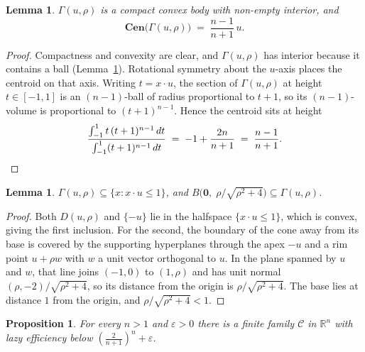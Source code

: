 \documentclass[12pt]{article}
\newtheorem{lemma}[theorem]{Lemma}
\newtheorem{proposition}[theorem]{Proposition}
\theoremstyle{definition}
\newcommand{\R}{\mathbb{R}}
\newcommand{\Cen}{\mathbf{Cen}}
\begin{document}
\begin{lemma}\label{lem:conebody}
$\Gamma(u,\rho)$ is a compact convex body with non-empty interior, and
\[
  \Cen\bigl(\Gamma(u,\rho)\bigr)\;=\;\frac{n-1}{n+1}\,u .
\]
\end{lemma}

\begin{proof}
Compactness and convexity are clear, and $\Gamma(u,\rho)$ has interior because
it contains a ball (Lemma~\ref{lem:conebounds}).  Rotational symmetry about the
$u$-axis places the centroid on that axis.  Writing $t=x\cdot u$, the section of
$\Gamma(u,\rho)$ at height $t\in[-1,1]$ is an $(n-1)$-ball of radius
proportional to $t+1$, so its $(n-1)$-volume is proportional to $(t+1)^{n-1}$.
Hence the centroid sits at height
\[
  \frac{\int_{-1}^{1}t\,(t+1)^{n-1}\,dt}{\int_{-1}^{1}(t+1)^{n-1}\,dt}
  \;=\;-1+\frac{2n}{n+1}\;=\;\frac{n-1}{n+1}. \qedhere
\]
\end{proof}

\begin{lemma}\label{lem:conebounds}
$\Gamma(u,\rho)\subseteq\{x:x\cdot u\le 1\}$, and
$B\bigl(\mathbf 0,\;\rho/\sqrt{\rho^2+4}\bigr)\subseteq\Gamma(u,\rho)$.
\end{lemma}

\begin{proof}
Both $D(u,\rho)$ and $\{-u\}$ lie in the halfspace $\{x\cdot u\le1\}$, which is
convex, giving the first inclusion.  For the second, the boundary of the cone
away from its base is covered by the supporting hyperplanes through the apex
$-u$ and a rim point $u+\rho w$ with $w$ a unit vector orthogonal to $u$.  In
the plane spanned by $u$ and $w$, that line joins $(-1,0)$ to $(1,\rho)$ and has
unit normal $(\rho,-2)/\sqrt{\rho^2+4}$, so its distance from the origin is
$\rho/\sqrt{\rho^2+4}$.  The base lies at distance $1$ from the origin, and
$\rho/\sqrt{\rho^2+4}<1$.
\end{proof}

\begin{proposition}\label{prop:construction}
For every $n>1$ and $\varepsilon>0$ there is a finite family $\mathcal{C}$ in
$\R^n$ with lazy efficiency below
$\left(\tfrac{2}{n+1}\right)^{n}+\varepsilon$.
\end{proposition}
\end{document}
